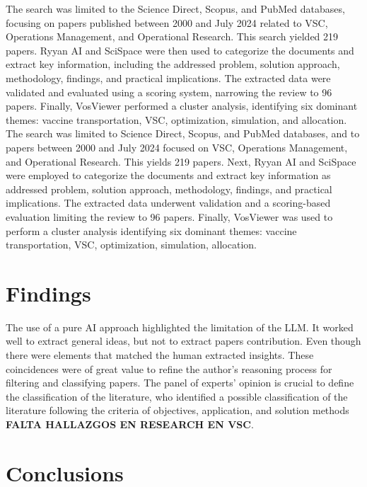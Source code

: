 \documentclass{optica-article}
\begin{document}
The search was limited to the Science Direct, Scopus, and PubMed databases, focusing on papers published between 2000 and July 2024 related to VSC, Operations Management, and Operational Research. This search yielded 219 papers. Ryyan AI and SciSpace were then used to categorize the documents and extract key information, including the addressed problem, solution approach, methodology, findings, and practical implications. The extracted data were validated and evaluated using a scoring system, narrowing the review to 96 papers. Finally, VosViewer performed a cluster analysis, identifying six dominant themes: vaccine transportation, VSC, optimization, simulation, and allocation.
The search was limited to Science Direct, Scopus, and PubMed databases, and to papers between 2000 and July 2024 focused on VSC, Operations Management, and Operational Research. This yields 219 papers. Next, Ryyan AI and SciSpace were employed to categorize the documents and extract key information as addressed problem, solution approach, methodology, findings, and practical implications. The extracted data underwent validation and a scoring-based evaluation limiting the review to 96 papers. Finally, VosViewer was used to perform a cluster analysis identifying six dominant themes: vaccine transportation, VSC, optimization, simulation, allocation.

\section{Findings}

The use of a pure AI approach highlighted the limitation of the LLM. It worked well to extract general ideas, but not to extract papers contribution. Even though there were elements that matched the human extracted insights. These coincidences were of great value to refine the author's reasoning process for filtering and classifying papers. The panel of experts’ opinion is crucial to define the classification of the literature, who identified a possible classification of the literature following the criteria of objectives, application, and solution methods \textbf{FALTA HALLAZGOS EN RESEARCH EN VSC}.

\section{Conclusions}
\end{document}
